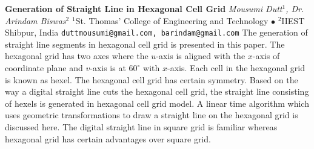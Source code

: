 
    \begin{conf-abstract}[]
        {\textbf{Generation of Straight Line in Hexagonal Cell Grid}}
        {\textit{Mousumi Dutt$^{1}$, Dr. Arindam Biswas$^{2}$}}
        {$^{1}$St. Thomas' College of Engineering and Technology $\bullet$ $^{2}$IIEST Shibpur, India}
        {\texttt{duttmousumi@gmail.com, barindam@gmail.com}}
        {The generation of straight line segments in hexagonal cell grid is presented in this paper.  The hexagonal grid has two axes where the $u$-axis is aligned with the $x$-axis of coordinate plane and $v$-axis is at $60^{\circ}$ with $x$-axis.  Each cell in the hexagonal grid is known as hexel. The hexagonal cell grid has certain symmetry. Based on the way a digital straight line cuts the hexagonal cell grid,  the straight line consisting of hexels is generated in hexagonal cell grid model. A linear time algorithm which uses geometric transformations to draw a straight line on the hexagonal grid is discussed here.  The digital straight line in square grid is familiar whereas hexagonal grid has certain advantages over square grid. }
    \end{conf-abstract}
        
